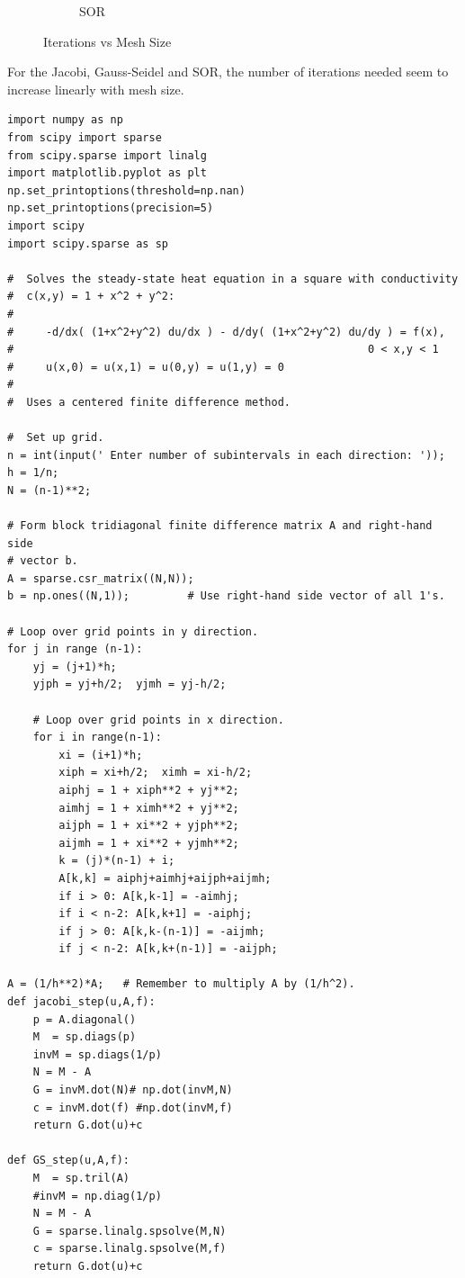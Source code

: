 \documentclass[letterpaper,12pt]{article}
\begin{document}
\begin{enumerate}
\begin{figure}[H]
\begin{subfigure}[b]{0.3\textwidth}
        \caption{SOR}
        \label{fig:tiger}
    \end{subfigure}
    \caption{Iterations vs Mesh Size}\label{fig:animals}
\end{figure}
For the Jacobi, Gauss-Seidel and SOR, the number of iterations needed seem to increase linearly with mesh size.

\begin{lstlisting}[style=myPythonstyle]
import numpy as np
from scipy import sparse
from scipy.sparse import linalg
import matplotlib.pyplot as plt
np.set_printoptions(threshold=np.nan)
np.set_printoptions(precision=5)
import scipy
import scipy.sparse as sp

#  Solves the steady-state heat equation in a square with conductivity
#  c(x,y) = 1 + x^2 + y^2:
#
#     -d/dx( (1+x^2+y^2) du/dx ) - d/dy( (1+x^2+y^2) du/dy ) = f(x),   
#                                                       0 < x,y < 1
#     u(x,0) = u(x,1) = u(0,y) = u(1,y) = 0
#
#  Uses a centered finite difference method.

#  Set up grid.
n = int(input(' Enter number of subintervals in each direction: '));
h = 1/n;
N = (n-1)**2;

# Form block tridiagonal finite difference matrix A and right-hand side 
# vector b.
A = sparse.csr_matrix((N,N));
b = np.ones((N,1));         # Use right-hand side vector of all 1's.

# Loop over grid points in y direction.
for j in range (n-1):
    yj = (j+1)*h;
    yjph = yj+h/2;  yjmh = yj-h/2;

    # Loop over grid points in x direction.
    for i in range(n-1):
        xi = (i+1)*h;
        xiph = xi+h/2;  ximh = xi-h/2;
        aiphj = 1 + xiph**2 + yj**2;
        aimhj = 1 + ximh**2 + yj**2;
        aijph = 1 + xi**2 + yjph**2;
        aijmh = 1 + xi**2 + yjmh**2;
        k = (j)*(n-1) + i;
        A[k,k] = aiphj+aimhj+aijph+aijmh;
        if i > 0: A[k,k-1] = -aimhj; 
        if i < n-2: A[k,k+1] = -aiphj; 
        if j > 0: A[k,k-(n-1)] = -aijmh; 
        if j < n-2: A[k,k+(n-1)] = -aijph; 

A = (1/h**2)*A;   # Remember to multiply A by (1/h^2).
def jacobi_step(u,A,f):
    p = A.diagonal()
    M  = sp.diags(p)
    invM = sp.diags(1/p)
    N = M - A
    G = invM.dot(N)# np.dot(invM,N)
    c = invM.dot(f) #np.dot(invM,f)
    return G.dot(u)+c

def GS_step(u,A,f):
    M  = sp.tril(A)
    #invM = np.diag(1/p)
    N = M - A
    G = sparse.linalg.spsolve(M,N)
    c = sparse.linalg.spsolve(M,f)
    return G.dot(u)+c


\end{lstlisting}
\end{enumerate}
\end{document}
